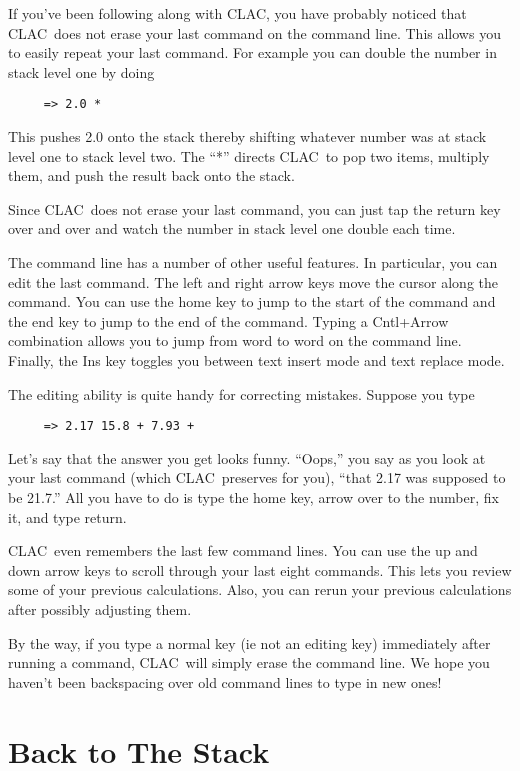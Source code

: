 \documentclass{report}
\newcommand{\CLAC}{CLAC}
\begin{document}
If you've been following along with \CLAC, you have probably noticed that \CLAC\ does not erase your last command on the command line. This allows you to easily repeat your last command. For example you can double the number in stack level one by doing

\begin{verbatim}
     => 2.0 *
\end{verbatim}

This pushes 2.0 onto the stack thereby shifting whatever number was at stack level one to stack level two. The ``*'' directs \CLAC\ to pop two items, multiply them, and push the result back onto the stack.

Since \CLAC\ does not erase your last command, you can just tap the return key over and over and watch the number in stack level one double each time.

The command line has a number of other useful features. In particular, you can edit the last command. The left and right arrow keys move the cursor along the command. You can use the home key to jump to the start of the command and the end key to jump to the end of the command. Typing a Cntl+Arrow combination allows you to jump from word to word on the command line. Finally, the Ins key toggles you between text insert mode and text replace mode.

The editing ability is quite handy for correcting mistakes. Suppose you type

\begin{verbatim}
     => 2.17 15.8 + 7.93 +
\end{verbatim}

Let's say that the answer you get looks funny. ``Oops,'' you say as you look at your last command (which \CLAC\ preserves for you), ``that 2.17 was supposed to be 21.7.'' All you have to do is type the home key, arrow over to the number, fix it, and type return.

\CLAC\ even remembers the last few command lines. You can use the up and down arrow keys to scroll through your last eight commands. This lets you review some of your previous calculations. Also, you can rerun your previous calculations after possibly adjusting them.

By the way, if you type a normal key (ie not an editing key) immediately after running a command, \CLAC\ will simply erase the command line. We hope you haven't been backspacing over old command lines to type in new ones!

\section{Back to The Stack}
\end{document}
